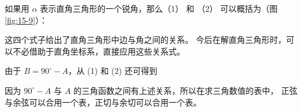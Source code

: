 如果用 $\alpha$ 表示直角三角形的一个锐角，那么（1） 和 （2） 可以概括为（图 \ref{fig:15-9}）：


\begin{figure}[htbp]
    \centering
    \begin{minipage}[b]{7cm}
        \centering
        
        \caption{}\label{fig:15-9}
    \end{minipage}
    \qquad
    \begin{minipage}[b]{7cm}
        \centering
        
        \caption{}\label{fig:15-10}
    \end{minipage}
\end{figure}


\begin{center}
\end{center}

这四个式子给出了直角三角形中边与角之间的关系。
今后在解直角三角形时，可以不必借助于直角坐标系，直接应用这些关系式。

由于 $B = 90^\circ - A$，从 (1) 和 (2) 还可得到
\begin{center}
\end{center}
因为 $90^\circ - A$ 与 $A$ 的三角函数之间有上述关系，所以在求三角数值的表中，
正弦与余弦可以合用一个表，正切与余切可以合用一个表。


%     

